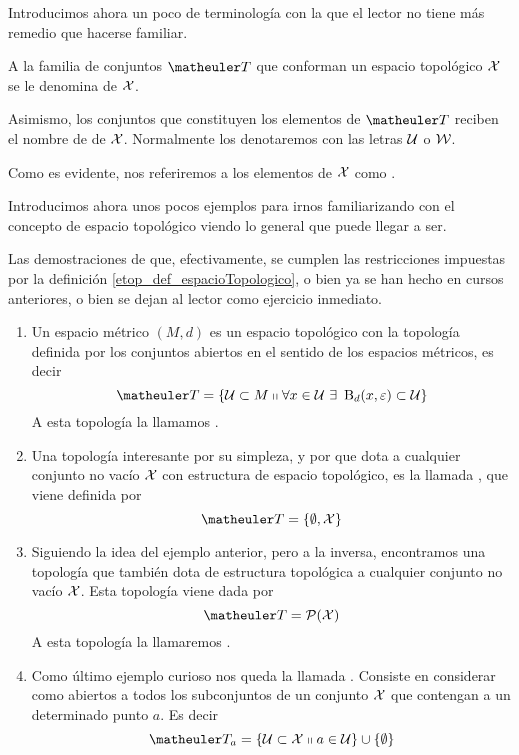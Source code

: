 Introducimos ahora un poco de terminología con la que el lector no tiene más remedio que hacerse familiar.
\begin{obs}[Terminología]
	\label{etop_obs_terminologia}
	A la familia de conjuntos $\T$ que conforman un espacio topológico $\mathcal{X}$ se le denomina  de $\mathcal{X}$.
	
	Asimismo, los conjuntos que constituyen los elementos de $\T$ reciben el nombre de  de $\mathcal{X}$. Normalmente los denotaremos con las letras $\mathcal{U}$ o $\mathcal{W}$.
	
	Como es evidente, nos referiremos a los elementos de $\mathcal{X}$ como .
\end{obs}
Introducimos ahora unos pocos ejemplos para irnos familiarizando con el concepto de espacio topológico viendo lo general que puede llegar a ser.
\begin{exa}[Topologías]
	\label{etop_exa_topologias}
	Las demostraciones de que, efectivamente, se cumplen las restricciones impuestas por la definición \ref{etop_def_espacioTopologico}, o bien ya se han hecho en cursos anteriores, o bien se dejan al lector como ejercicio inmediato.
	\begin{enumerate}
		\item Un espacio métrico $(M,d)$ es un espacio topológico con la topología definida por los conjuntos abiertos en el sentido de los espacios métricos, es decir
		\begin{equation}
		\label{etop_eq_topologiaRn}
		\T = \{\U\subset M\tq \forall x\in\U\ \exists\  \bola_{d}(x,\varepsilon)\subset\U\}
		\end{equation}
		A esta topología la llamamos .
		\item Una topología interesante por su simpleza, y por que dota a cualquier conjunto no vacío $\mathcal{X}$ con estructura de espacio topológico, es la llamada , que viene definida por \begin{equation}
		\label{etop_eq_topologiaTrivial}
		\T=\{\emptyset, \X\}
		\end{equation}
		\item Siguiendo la idea del ejemplo anterior, pero a la inversa, encontramos una topología que también dota de estructura topológica a cualquier conjunto no vacío $\mathcal{X}$. Esta topología viene dada por
		\begin{equation}
		\label{etop_eq_topologiaDiscreta}
		\T = \partes(\X)
		\end{equation}
		A esta topología la llamaremos .
		\item Como último ejemplo curioso nos queda la llamada . Consiste en considerar como abiertos a todos los subconjuntos de un conjunto $\mathcal{X}$ que contengan a un determinado punto $a$. Es decir
		\begin{equation}
		\label{etop_eq_topologiaPunto}
		\T_a = \{\U \subset \X\tq a\in\U\}\cup\{\emptyset\}
		\end{equation}
		

\end{enumerate}
\end{exa}
